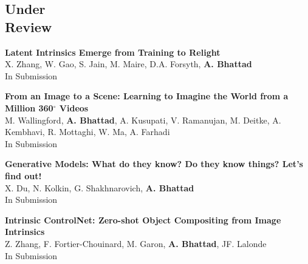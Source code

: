 \documentclass[margin,line]{res}
\begin{document}
\begin{resume}
\section{\sc \large Under\\ Review}
\renewcommand*{\labelenumi}{\theenumi.}
\begin{etaremune}[start=4, leftmargin=15pt]
\item {\bf {Latent Intrinsics Emerge from Training to Relight
}} \\{X. Zhang, W. Gao, S. Jain, M. Maire, D.A. Forsyth, {\bf A. Bhattad}} \\
In Submission
\item {\bf {From an Image to a Scene: Learning to Imagine the World from a Million 360$^\circ$ Videos
}} \\{M. Wallingford, {\bf A. Bhattad}, A. Kusupati, V. Ramanujan, M. Deitke, A. Kembhavi, R. Mottaghi, W. Ma, A. Farhadi } \\
In Submission
\item {\bf {Generative Models: What do they know? Do they know things? Let's find out!}} \\{X. Du, N. Kolkin, G. Shakhnarovich, {\bf A. Bhattad}} \\
In Submission
\item {\bf {Intrinsic ControlNet: Zero-shot Object Compositing from Image Intrinsics
}} \\{Z. Zhang, F. Fortier-Chouinard, M. Garon, {\bf A. Bhattad}, JF. Lalonde} \\
In Submission
\end{etaremune}


\end{resume}
\end{document}
